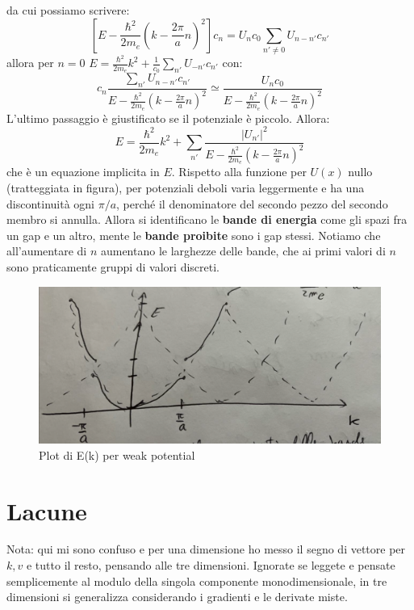 \documentclass{book}
\begin{document}
                    da cui possiamo scrivere:
                    $$[E - \frac{\hbar ^{2}}{2m_{e}}(k - \frac{2\pi }{a}n)^{2}]c_{n}= U_{n}c_{0}\sum_{n' \neq 0}U_{n-n'}c_{n'} $$
                    allora per $n=0$ $E = \displaystyle \frac{\hbar ^{2}}{2m_{e}}k^{2} + \frac{1}{c_{0}} \sum_{n'} U_{-n'}c_{n'}$
                    con:
                    $$c_{n} \frac{\sum_{n'}U_{n-n'}c_{n'}}{E - \frac{\hbar ^{2}}{2m_{e}}(k - \frac{2\pi }{a}n)^{2}} \simeq \frac{U_{n}c_{0}}{E - \frac{\hbar ^{2}}{2m_{e}}(k - \frac{2\pi }{a}n)^{2}}$$
                    L'ultimo passaggio è giustificato se il potenziale è piccolo. Allora:
                    $$E = \frac{\hbar ^{2}}{2m_{e}}k^{2} + \sum_{n'} \frac{|U_{n'}|^{2}}{E - \frac{\hbar ^{2}}{2m_{e}}(k - \frac{2\pi }{a}n)^{2}}$$
                    che è un equazione implicita in $E$.
                    Rispetto alla funzione per $U(x)$ nullo (tratteggiata in figura), per potenziali deboli varia leggermente e ha una discontinuità ogni $\pi/a$, perché il denominatore del secondo pezzo del secondo membro si annulla. Allora si identificano le \textbf{bande di energia} come gli spazi fra un gap e un altro, mente le \textbf{bande proibite} sono i gap stessi. Notiamo che all'aumentare di $n$ aumentano le larghezze delle bande, che ai primi valori di $n$ sono praticamente gruppi di valori discreti.
                    \begin{figure}[h!]
                        \centering
                        \includegraphics[width=0.5\linewidth]{img/crostiniLez20.png}
                        \caption{Plot di E(k) per weak potential}
                    \end{figure}
                    
            \section{Lacune}
                Nota: qui mi sono confuso e per una dimensione ho messo il segno di vettore per $k, v$ e tutto il resto, pensando alle tre dimensioni. Ignorate se leggete e pensate semplicemente al modulo della singola componente monodimensionale, in tre dimensioni si generalizza considerando i gradienti e le derivate miste.
\end{document}
